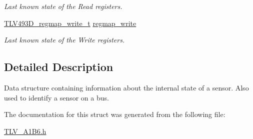\begin{DoxyCompactItemize}
\begin{DoxyCompactList}\small\item\em Last known state of the Read registers. \end{DoxyCompactList}\item 
\mbox{\label{struct_t_l_v493_d__data__t_aa17835fca124976dc402c4305da2b724}} 
\mbox{\hyperlink{struct_t_l_v493_d__regmap__write__t}{T\+L\+V493\+D\+\_\+regmap\+\_\+write\+\_\+t}} \mbox{\hyperlink{struct_t_l_v493_d__data__t_aa17835fca124976dc402c4305da2b724}{regmap\+\_\+write}}
\begin{DoxyCompactList}\small\item\em Last known state of the Write registers. \end{DoxyCompactList}\end{DoxyCompactItemize}


\subsection{Detailed Description}
Data structure containing information about the internal state of a sensor. Also used to identify a sensor on a bus. 

The documentation for this struct was generated from the following file\+:\begin{DoxyCompactItemize}
\item 
\mbox{\hyperlink{_t_l_v___a1_b6_8h}{T\+L\+V\+\_\+\+A1\+B6.\+h}}\end{DoxyCompactItemize}
